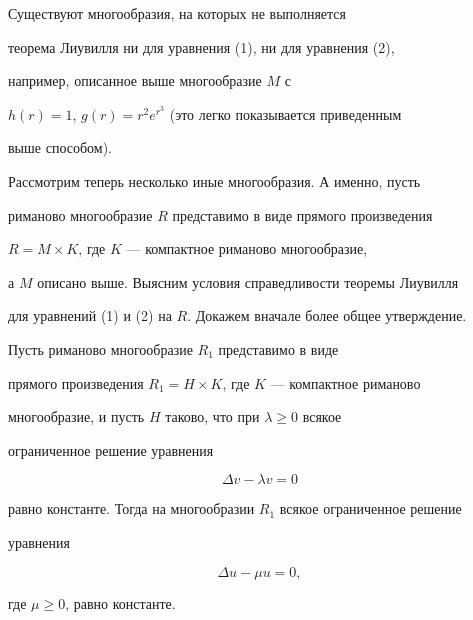 \begin{note} Существуют многообразия, на которых не выполняется


теорема Лиувилля ни для уравнения (1), ни для уравнения (2),


например, описанное выше многообразие $M$ с


$h(r)=1$, $g(r)=r^2e^{r^3}$ (это легко показывается приведенным


выше способом).


\end{note}





Рассмотрим теперь несколько иные многообразия. А именно, пусть


риманово многообразие $R$ представимо в виде прямого произведения


$R = M \times K$, где $K$ --- компактное риманово многообразие,


а $M$ описано выше. Выясним условия справедливости теоремы Лиувилля


для уравнений (1) и (2) на $R$. Докажем вначале более общее утверждение.





\begin{lem} Пусть риманово многообразие $R_1$ представимо в виде


прямого произведения $R_1 = H \times K$, где $K$ --- компактное риманово


многообразие, и пусть $H$ таково, что при $\lambda \ge 0$ всякое


ограниченное решение уравнения


\begin{equation}


\Delta v - \lambda v = 0


\end{equation}


равно константе. Тогда на многообразии $R_1$ всякое ограниченное решение


уравнения


\begin{equation}


\Delta u - \mu u = 0,


\end{equation}


где $\mu \ge 0$, равно константе.


\end{lem}





